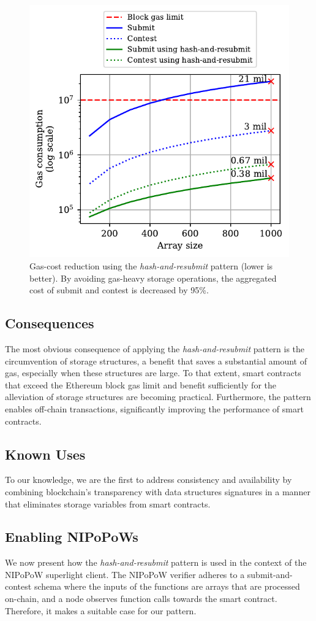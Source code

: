 \begin{figure}[!h]
\begin{center}
\includegraphics[width=0.6 \columnwidth]{figures/har-example.pdf}
\end{center}
\caption{Gas-cost reduction using the \emph{hash-and-resubmit} pattern (lower
is better). By avoiding gas-heavy storage operations, the aggregated cost of
\textsf{submit} and \textsf{contest} is decreased by 95\%.}
\label{fig:har-example}
\end{figure}

\subsection{Consequences} The most obvious consequence of applying the
\emph{hash-and-resubmit} pattern is the circumvention of storage
structures, a benefit that saves a substantial amount of gas, especially when
these structures are large. To that extent, smart contracts that exceed the
Ethereum block gas limit and benefit sufficiently for the alleviation of
storage structures are becoming practical. Furthermore, the pattern enables
off-chain transactions, significantly improving the performance of smart
contracts.

\subsection{Known Uses} To our knowledge, we are the first to address
consistency and availability by combining blockchain's transparency with data
structures signatures in a manner that eliminates storage variables from
smart contracts.

\subsection{Enabling NIPoPoWs} We now present how the
\emph{hash-and-resubmit} pattern is used in the context of the NIPoPoW
superlight client. The NIPoPoW verifier adheres to a submit-and-contest schema
where the inputs of the functions are arrays that are processed on-chain, and a
node observes function calls towards the smart contract.  Therefore, it
makes a suitable case for our pattern.


